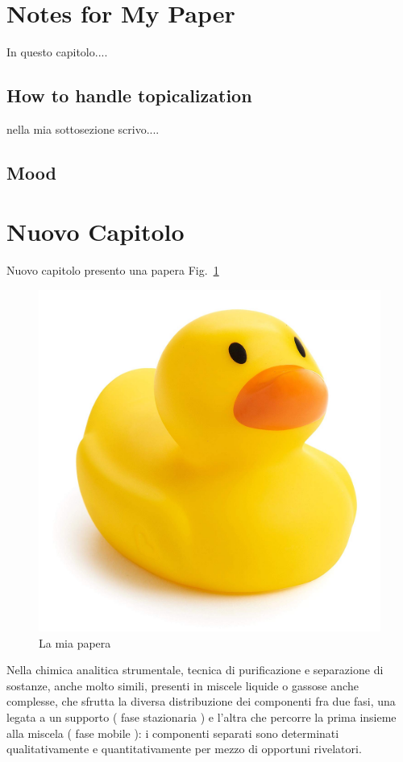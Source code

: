 \documentclass[13pt]{article}
\newcommand\figref{Fig.~\ref}
\begin{document}
\section{Notes for My Paper}
In questo capitolo....


\subsection{How to handle topicalization}
 nella mia sottosezione scrivo....
 
\subsection{Mood}

\section{Nuovo Capitolo}
Nuovo capitolo presento una papera \figref{fig:duck}

\begin{figure}[h]
	\centering
	\includegraphics[width=0.9\columnwidth]{Images/duck}
	\caption{La mia papera}
	\label{fig:duck}
\end{figure}

Nella chimica analitica strumentale, tecnica di purificazione e separazione di sostanze, anche molto simili, presenti in miscele liquide o gassose anche complesse, che sfrutta la diversa distribuzione dei componenti fra due fasi, una legata a un supporto ( fase stazionaria ) e l'altra che percorre la prima insieme alla miscela ( fase mobile ): i componenti separati sono determinati qualitativamente e quantitativamente per mezzo di opportuni rivelatori.
\end{document}
